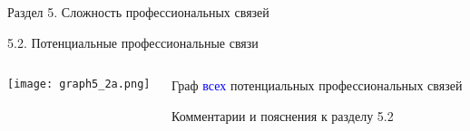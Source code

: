\begin{frame}{Раздел 5. Сложность профессиональных связей}

{\large 5.2. Потенциальные профессиональные связи}

\begin{columns}[T] %
\begin{column}{0.7\textwidth} %
\centering
          \texttt{[image: graph5\_2a.png]}
\end{column}
\begin{column}{0.3\textwidth} %

\small
Граф \textcolor{blue}{всех} потенциальных профессиональных связей

Комментарии и пояснения к разделу 5.2

\end{column}
\end{columns}
\end{frame}


